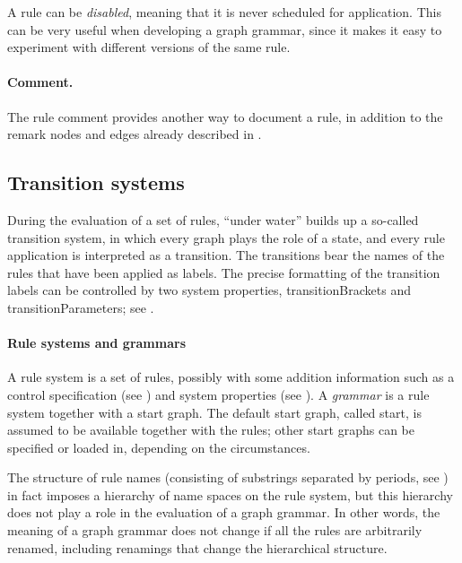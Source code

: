 A rule can be \emph{disabled}, meaning that it is never scheduled for
application. This can be very useful when developing a graph grammar, since it
makes it easy to experiment with different versions of the same rule.

\paragraph{Comment.}

The rule comment provides another way to document a rule, in addition to the
remark nodes and edges already described in .

\subsection{Transition systems}

During the evaluation of a set of rules, \Groove{} ``under water'' builds up a
so-called transition system, in which every graph plays the role of a state,
and every rule application is interpreted as a transition. The transitions bear
the names of the rules that have been applied as labels. The precise formatting
of the transition labels can be controlled by two system properties,
\textsf{transitionBrackets} and \textsf{transitionParameters}; see
.

\paragraph{Rule systems and grammars}

A rule system is a set of rules, possibly with some addition information such
as a control specification (see ) and system properties (see
). A \emph{grammar} is a rule system together with a
start graph. The default start graph, called \textsf{start}, is assumed to be
available together with the rules; other start graphs can be specified or
loaded in, depending on the circumstances.

The structure of rule names (consisting of substrings separated by periods, see
) in fact imposes a hierarchy of name spaces on the rule system,
but this hierarchy does not play a role in the evaluation of a graph grammar.
In other words, the meaning of a graph grammar does not change if all the rules
are arbitrarily renamed, including renamings that change the hierarchical
structure.
